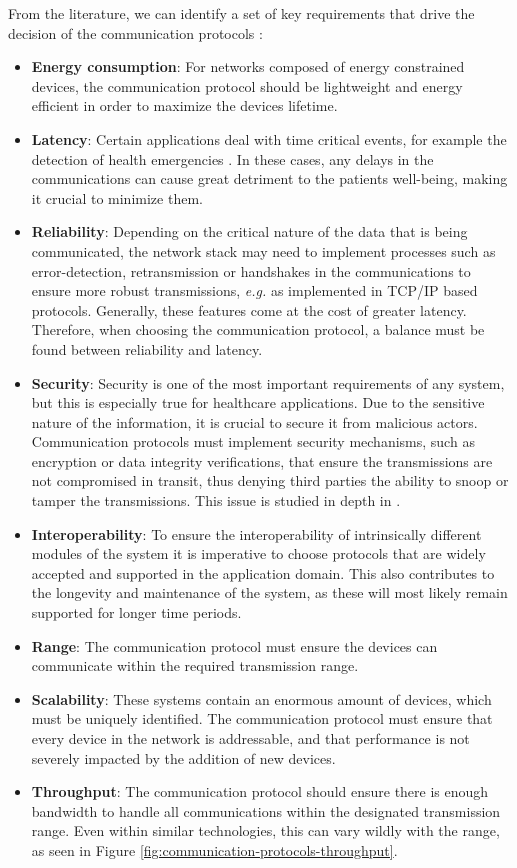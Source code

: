From the literature, we can identify a set of key requirements that drive the decision of the communication protocols \cite{Baker2017, Catarinucci2015, Adame2018}:

\begin{itemize}
    \item \textbf{Energy consumption}: For networks composed of energy constrained devices, the communication protocol should be lightweight and energy efficient in order to maximize the devices lifetime. 
    \item \textbf{Latency}: Certain applications deal with time critical events, for example the detection of health emergencies \cite{Catarinucci2015}. In these cases, any delays in the communications can cause great detriment to the patients well-being, making it crucial to minimize them.
    \item \textbf{Reliability}: Depending on the critical nature of the data that is being communicated, the network stack may need to implement processes such as error-detection, retransmission or handshakes in the communications to ensure more robust transmissions, \textit{e.g.} as implemented in TCP/IP based protocols. Generally, these features come at the cost of greater latency. Therefore, when choosing the communication protocol, a balance must be found between reliability and latency.
    \item \textbf{Security}: Security is one of the most important requirements of any system, but this is especially true for healthcare applications. Due to the sensitive nature of the information, it is crucial to secure it from malicious actors. Communication protocols must implement security mechanisms, such as encryption or data integrity verifications, that ensure the transmissions are not compromised in transit, thus denying third parties the ability to snoop or tamper the transmissions. This issue is studied in depth in \cite{Gope2016}.
    \item \textbf{Interoperability}: To ensure the interoperability of intrinsically different modules of the system it is imperative to choose protocols that are widely accepted and supported in the application domain. This also contributes to the longevity and maintenance of the system, as these will most likely remain supported for longer time periods. 
    \item \textbf{Range}: The communication protocol must ensure the devices can communicate within the required transmission range.
    \item \textbf{Scalability}: These systems contain an enormous amount of devices, which must be uniquely identified. The communication protocol must ensure that every device in the network is addressable, and that performance is not severely impacted by the addition of new devices.
    \item \textbf{Throughput}: The communication protocol should ensure there is enough bandwidth to handle all communications within the designated transmission range. Even within similar technologies, this can vary wildly with the range, as seen in Figure \ref{fig:communication-protocols-throughput}.  

\end{itemize}

